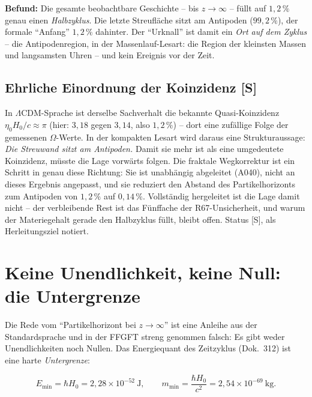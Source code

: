 \documentclass[11pt]{report}
\begin{document}
\textbf{Befund:} Die gesamte beobachtbare Geschichte -- bis
$z \to \infty$ -- füllt auf $1{,}2\,\%$ genau einen
\emph{Halbzyklus}. Die letzte Streufläche sitzt am Antipoden
($99{,}2\,\%$), der formale \enquote{Anfang} $1{,}2\,\%$ dahinter.
Der \enquote{Urknall} ist damit ein \emph{Ort auf dem Zyklus} --
die Antipodenregion, in der Massenlauf-Lesart: die Region der
kleinsten Massen und langsamsten Uhren -- und kein Ereignis vor
der Zeit.

\section{Ehrliche Einordnung der Koinzidenz [S]}

In $\Lambda$CDM-Sprache ist derselbe Sachverhalt die bekannte
Quasi-Koinzidenz $\eta_0 H_0/c \approx \pi$ (hier: $3{,}18$ gegen
$3{,}14$, also $1{,}2\,\%$) -- dort eine zufällige Folge der
gemessenen $\Omega$-Werte. In der kompakten Lesart wird daraus
eine Strukturaussage: \emph{Die Streuwand sitzt am Antipoden.}
Damit sie mehr ist als eine umgedeutete Koinzidenz, müsste die
Lage vorwärts folgen. Die fraktale Wegkorrektur ist ein Schritt in
genau diese Richtung: Sie ist unabhängig abgeleitet (A040), nicht
an dieses Ergebnis angepasst, und sie reduziert den Abstand des
Partikelhorizonts zum Antipoden von $1{,}2\,\%$ auf
$0{,}14\,\%$. Vollständig hergeleitet ist die Lage damit nicht --
der verbleibende Rest ist das Fünffache der R67-Unsicherheit, und
warum der Materiegehalt gerade den Halbzyklus füllt, bleibt offen.
Status [S], als Herleitungsziel notiert.

\chapter{Keine Unendlichkeit, keine Null: die Untergrenze}

Die Rede vom \enquote{Partikelhorizont bei $z\to\infty$} ist eine
Anleihe aus der Standardsprache und in der FFGFT streng genommen
falsch: Es gibt weder Unendlichkeiten noch Nullen. Das
Energiequant des Zeitzyklus (Dok.~312) ist eine harte
\emph{Untergrenze}:

\begin{equation}
  E_\text{min} = \hbar H_0 = 2{,}28\times10^{-52}~\text{J},
  \qquad
  m_\text{min} = \frac{\hbar H_0}{c^2}
  = 2{,}54\times10^{-69}~\text{kg}.
\end{equation}
\end{document}
